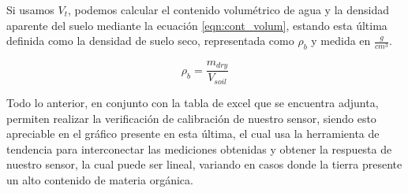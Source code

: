 Si usamos $V_t$, podemos calcular el contenido volumétrico de agua y la densidad aparente del suelo mediante la ecuación \ref{eqn:cont_volum}, estando esta última definida como la densidad de suelo seco, representada como $\rho_b$ y medida en $\frac{g}{cm^3}$.

\begin{equation}
    \rho_b = \frac{m_{dry}}{V_{soil}}
    \label{eqn:bulk_den}
\end{equation}

Todo lo anterior, en conjunto con la tabla de excel que se encuentra adjunta, permiten realizar la verificación de calibración de nuestro sensor, siendo esto apreciable en el gráfico presente en esta última, el cual usa la herramienta de tendencia para interconectar las mediciones obtenidas y obtener la respuesta de nuestro sensor, la cual puede ser lineal, variando en casos donde la tierra presente un alto contenido de materia orgánica.
